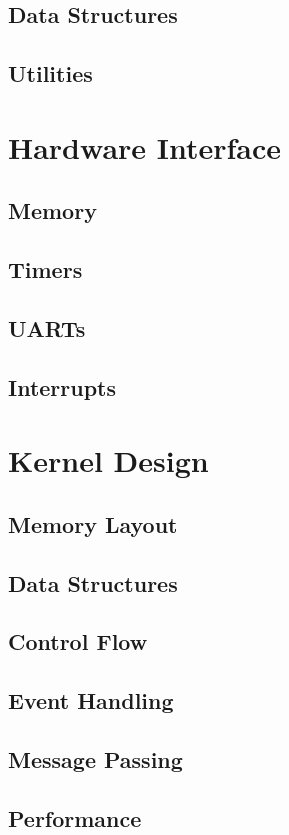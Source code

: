 \documentclass[twoside,a4paper]{refart}
\begin{document}
\subsection{Data Structures}
\subsection{Utilities}

\section{Hardware Interface}
\subsection{Memory}
\subsection{Timers}
\subsection{UARTs}
\subsection{Interrupts}

\section{Kernel Design}
\subsection{Memory Layout}
\subsection{Data Structures}
\subsection{Control Flow}
\subsection{Event Handling}
\subsection{Message Passing}
\subsection{Performance}
\end{document}
